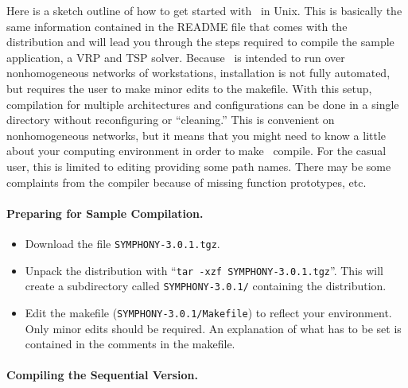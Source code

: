 Here is a sketch outline of how to get started with \BB\ in Unix. This is
basically the same information contained in the README file that comes with
the distribution and will lead you through the steps required to compile the
sample application, a VRP and TSP solver. Because \BB\ is intended to run over
nonhomogeneous networks of workstations, installation is not fully automated,
but requires the user to make minor edits to the makefile.  With this setup,
compilation for multiple architectures and configurations can be done in a
single directory without reconfiguring or ``cleaning.'' This is convenient on
nonhomogeneous networks, but it means that you might need to know a little
about your computing environment in order to make \BB\ compile. For the casual
user, this is limited to editing providing some path names. There may be some
complaints from the compiler because of missing function prototypes, etc.

\paragraph{Preparing for Sample Compilation.}

\begin{itemize}

        \item Download the file {\tt SYMPHONY-3.0.1.tgz}.

        \item Unpack the distribution with ``{\tt tar -xzf
        SYMPHONY-3.0.1.tgz}''. This will create a subdirectory called
        {\tt SYMPHONY-3.0.1/} containing the distribution.
        
        \item Edit the makefile ({\tt SYMPHONY-3.0.1/Makefile}) to reflect your
	environment. Only minor edits should be required. An explanation of
	what has to be set is contained in the comments in the makefile.

\end{itemize}
        
\paragraph{Compiling the Sequential Version.}

